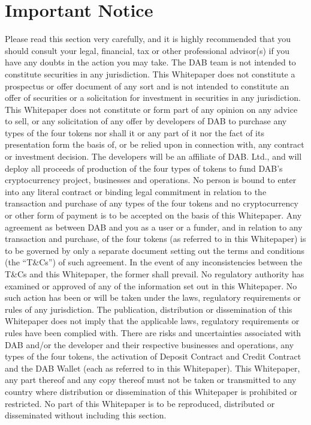 \documentclass[review]{elsarticle}
\begin{document}
\section{Important Notice}
Please read this section very carefully, and it is highly recommended that you should consult your legal, financial, tax or other professional advisor(s) if you have any doubts in the action you may take.
The DAB team is not intended to constitute securities in any jurisdiction. This Whitepaper does not constitute a prospectus or offer document of any sort and is not intended to constitute an offer of securities or a solicitation for investment in securities in any jurisdiction. 
This Whitepaper does not constitute or form part of any opinion on any advice to sell, or any solicitation of any offer by developers of DAB to purchase any types of the four tokens nor shall it or any part of it nor the fact of its presentation form the basis of, or be relied upon in connection with, any contract or investment decision. 
The developers will be an affiliate of DAB. Ltd., and will deploy all proceeds of production of the four types of tokens to fund DAB's cryptocurrency project, businesses and operations. 
No person is bound to enter into any literal contract or binding legal commitment in relation to the transaction and purchase of any types of the four tokens and no cryptocurrency or other form of payment is to be accepted on the basis of this Whitepaper. 
Any agreement as between DAB and you as a user or a funder, and in relation to any transaction and purchase, of the four tokens (as referred to in this Whitepaper) is to be governed by only a separate document setting out the terms and conditions (the ``T\&Cs'') of such agreement. In the event of any inconsistencies between the T\&Cs and this Whitepaper, the former shall prevail.
No regulatory authority has examined or approved of any of the information set out in this Whitepaper. No such action has been or will be taken under the laws, regulatory requirements or rules of any jurisdiction. The publication, distribution or dissemination of this Whitepaper does not imply that the applicable laws, regulatory requirements or rules have been complied with. 
There are risks and uncertainties associated with DAB and/or the developer and their respective businesses and operations, any types of the four tokens, the activation of Deposit Contract and Credit Contract and the DAB Wallet (each as referred to in this Whitepaper). 
This Whitepaper, any part thereof and any copy thereof must not be taken or transmitted to any country where distribution or dissemination of this Whitepaper is prohibited or restricted. 
No part of this Whitepaper is to be reproduced, distributed or disseminated without including this section.
\end{document}
